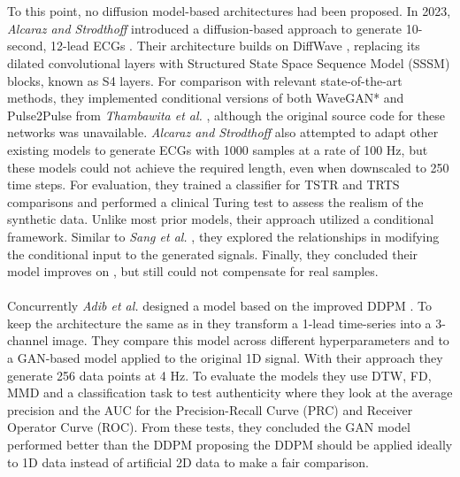 \\ \\
To this point, no diffusion model-based architectures had been proposed. In 2023, \textit{Alcaraz and Strodthoff} introduced a diffusion-based approach to generate 10-second, 12-lead ECGs \cite{alcarazDiffusionbasedConditionalECG2023}. Their architecture builds on DiffWave \cite{kongDiffWaveVersatileDiffusion2021}, replacing its dilated convolutional layers with Structured State Space Sequence Model (SSSM) blocks, known as S4 layers. For comparison with relevant state-of-the-art methods, they implemented conditional versions of both WaveGAN* and Pulse2Pulse from \textit{Thambawita et al.} \cite{thambawitaDeepFakeElectrocardiogramsUsing2021}, although the original source code for these networks was unavailable. \textit{Alcaraz and Strodthoff} also attempted to adapt other existing models \cite{yoonTimeseriesGenerativeAdversarial2019, liTTSGANTransformerbasedTimeSeries2022, sangGeneration12LeadElectrocardiogram2022} to generate ECGs with 1000 samples at a rate of 100 Hz, but these models could not achieve the required length, even when downscaled to 250 time steps. For evaluation, they trained a classifier for TSTR and TRTS comparisons and performed a clinical Turing test to assess the realism of the synthetic data. Unlike most prior models, their approach utilized a conditional framework. Similar to \textit{Sang et al.} \cite{sangGeneration12LeadElectrocardiogram2022}, they explored the relationships in modifying the conditional input to the generated signals. Finally, they concluded their model improves on \cite{thambawitaDeepFakeElectrocardiogramsUsing2021}, but still could not compensate for real samples.
\\ \\
Concurrently \textit{Adib et al.} \cite{adibSyntheticECGSignal2022} designed a model based on the improved DDPM \cite{nicholImprovedDenoisingDiffusion2021}. To keep the architecture the same as in \cite{nicholImprovedDenoisingDiffusion2021} they transform a 1-lead time-series into a 3-channel image. They compare this model across different hyperparameters and to a GAN-based model applied to the original 1D signal. With their approach they generate 256 data points at 4 Hz. To evaluate the models they use DTW, FD, MMD and a classification task to test authenticity where they look at the average precision and the AUC for the Precision-Recall Curve (PRC) and Receiver Operator Curve (ROC). From these tests, they concluded the GAN model performed better than the DDPM proposing the DDPM should be applied ideally to 1D data instead of artificial 2D data to make a fair comparison.
